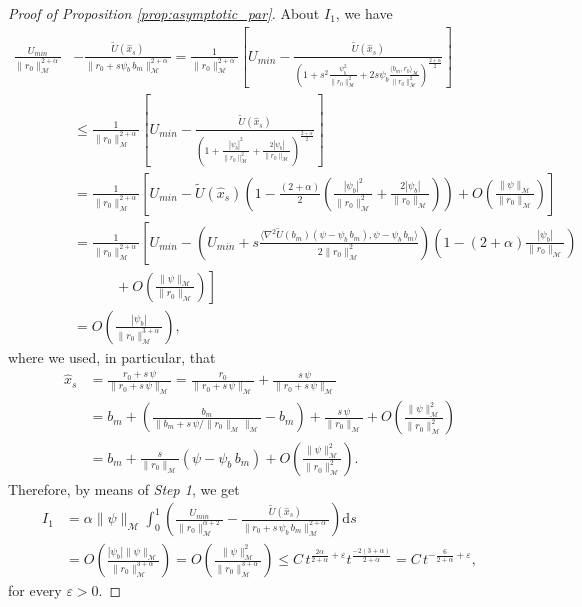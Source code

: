 \documentclass[a4paper,10pt]{amsart}
\newcommand{\ud}{\mathrm{d}}
\theoremstyle{plain}
\theoremstyle{definition}
\numberwithin{equation}{section}
\numberwithin{thm}{section}
\begin{document}
\begin{proof}[Proof of Proposition \ref{prop:asymptotic_par}]
About $I_1$,  we have
{
\[
\begin{aligned}
 \frac{U_{min}}{\|r_0\|_\mathcal{M}^{2+\alpha}}&-\frac{\tilde U(\hat x_s)}{\|r_0+s\psi_b\,b_m\|_\mathcal{M}^{2+\alpha}}
=
\frac{1}{\|r_0\|_\mathcal{M}^{2+\alpha}}
\left[
U_{min}
-
\frac{\tilde U(\hat x_s)}{
\left( 1 + s^2\frac{\psi_b^2}{\|r_0\|_\mathcal{M}^2} + 2s\psi_b \frac{\langle b_m,r_0\rangle_\mathcal{M}}{\|r_0\|_\mathcal{M}^2} \right)^{\frac{2+\alpha}{2}}}
\right]
\\[0.6em]
& \le \frac{1}{\|r_0\|_\mathcal{M}^{2+\alpha}}
\left[
U_{min}
-
\frac{\tilde U(\hat x_s)}{
\left( 1 + \frac{|\psi_b|^2}{\|r_0\|_\mathcal{M}^2} +  \frac{ 2|\psi_b|}{\|r_0\|_\mathcal{M}} \right)^{\frac{2+\alpha}{2}}}
\right]
\\[0.6em]
&=\frac{1}{\|r_0\|_\mathcal{M}^{2+\alpha}}\left[U_{min} - \tilde U(\hat x_s) \left(1 - \frac{(2+\alpha)}{2}\left(\frac{|\psi_b|^2}{\|r_0\|_\mathcal{M}^2} + \frac{2|\psi_b|}{\|r_0\|_\mathcal{M}}\right)\right)+O\left(\frac{\|\psi\|_\mathcal{M}}{\|r_0\|_\mathcal{M}}\right)\right]
\\
&=\frac{1}{\|r_0\|_\mathcal{M}^{2+\alpha}}\left[U_{min}-\left(U_{min}+s\frac{\langle \nabla^2\tilde U(b_m)(\psi-\psi_b\,b_m),\psi- \psi_b\,b_m\rangle}{2\|r_0\|_\mathcal{M}^2}\right)\left(1-(2+\alpha)\frac{|\psi_b|}{\|r_0\|_{\mathcal M}}\right)\right.
\\
&\quad \quad \quad +\left.O\left(\frac{\|\psi\|_\mathcal{M}}{\|r_0\|_\mathcal{M}}\right)\right]
\\
&=O\left(\frac{|\psi_b|}{\|r_0\|_{\mathcal M}^{3+\alpha}}\right),
\end{aligned}
\]
where we used, in particular, that
\begin{equation}\label{eq:x_hat}
\begin{aligned}
    \hat x_s &= \frac{r_0+s\,\psi}{\|r_0+s\,\psi\|_\mathcal{M}} = \frac{r_0}{\|r_0+s\,\psi\|_\mathcal{M}}+\frac{s\,\psi}{\|r_0+s\,\psi\|_\mathcal{M}}
    \\
    &=b_m+\left(\frac{b_m}{\|b_m+s\,\psi/\|r_0\|_\mathcal{M}\|_\mathcal{M}}-b_m\right) + \frac{s\,\psi}{\|r_0\|_\mathcal{M}} + O\left(\frac{\|\psi\|_\mathcal{M}^2}{\|r_0\|_\mathcal{M}^2}\right)
    \\
    &= b_m + \frac{s}{\|r_0\|_\mathcal{M}}\left(\psi-\psi_b\,b_m\right)+ O\left(\frac{\|\psi\|_\mathcal{M}^2}{\|r_0\|_\mathcal{M}^2}\right).
    \end{aligned}
\end{equation}
}
Therefore, by means of {\em Step 1}, we get
\[
\begin{aligned}
I_1&=\alpha\|\psi\|_\mathcal{M}\int_0^1\left(
\frac{U_{min}}{\|r_0\|_\mathcal{M}^{\alpha+2}}
-
\frac{\tilde U(\hat x_s)}{\|r_0+s\,\psi_b\,b_m\|_\mathcal{M}^{2+\alpha}}\right)\ud s
\\
& =
O\!\left(
\frac{|\psi_b|\|\psi\|_\mathcal{M}}{\|r_0\|_\mathcal{M}^{3+\alpha}}
\right) = O\!\left(
\frac{\|\psi\|_\mathcal{M}^2}{\|r_0\|_\mathcal{M}^{3+\alpha}}
\right) \le C\, t^{\frac{2\alpha}{2+\alpha}+\varepsilon}t^\frac{-2(3+\alpha)}{2+\alpha}= C\,t^{-\frac{6}{2+\alpha}+\varepsilon},
\end{aligned}
\]
for every $\varepsilon>0$.


\end{proof}
\end{document}
